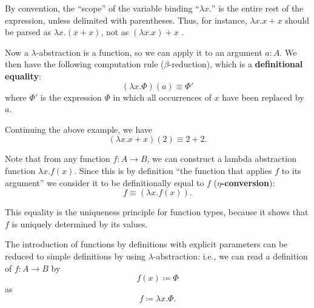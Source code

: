 By convention, the ``scope'' of the variable binding ``$\lambda x.$'' is the entire rest of the expression, unless delimited with parentheses. Thus, for instance, $\lambda x. x + x$ should be parsed as $\lambda x.(x + x)$, not as $(\lambda x. x) + x$ .


Now a $\lambda$-abstraction is a function, so we can apply it to an argument $a : A$. We then have the following computation rule ($\beta$-reduction), which is a \textbf{definitional equality}:
$$ (\lambda x. \Phi)(a) \equiv \Phi' $$ 
where $\Phi'$ is the expression $\Phi$ in which all occurrences of $x$ have been replaced by $a$.
\begin{example}
    Continuing the above example, we have
    $$ (\lambda x. x + x)(2) \equiv 2 + 2. $$
\end{example}

Note that from any function $f : A \to B$, we can construct a lambda abstraction function $\lambda x. f(x)$. 
Since this is by definition ``the function that applies $f$ to its argument'' we consider it to be definitionally
 equal to $f$ (\textbf{$\eta$-conversion}):
$$ f \equiv (\lambda x. f(x)). $$

This equality is the uniqueness principle for function types, because it shows that $f$ is uniquely determined by its values.

The introduction of functions by definitions with explicit parameters can be reduced to simple definitions by using $\lambda$-abstraction: i.e., we can read a definition of $f : A \to B$ by
$$ f(x) \coloneqq \Phi 
$$ 
as
$$ f \coloneqq \lambda x. \Phi. $$



